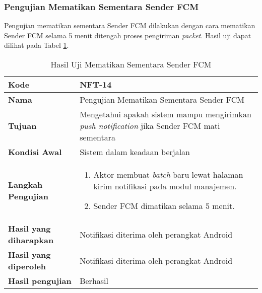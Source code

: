 \subsubsection{Pengujian Mematikan Sementara Sender FCM}
\par Pengujian mematikan sementara Sender FCM dilakukan dengan cara mematikan Sender FCM selama 5 menit ditengah proses pengiriman \textit{packet}. Hasil uji dapat dilihat pada Tabel \ref{t:nft_sender_fcm_mati}.
\begin{longtable}{|p{3cm}|p{6.5cm}|}
	\caption{Hasil Uji Mematikan Sementara Sender FCM} \label{t:nft_sender_fcm_mati} \\ \hline
	\textbf{Kode} & NFT-14 \\ \hline
	\textbf{Nama} & Pengujian Mematikan Sementara Sender FCM \\ \hline
	\textbf{Tujuan} & Mengetahui apakah sistem mampu mengirimkan \textit{push notification} jika Sender FCM mati sementara \\ \hline
	\textbf{Kondisi Awal} & Sistem dalam keadaan berjalan \\ \hline
	\textbf{Langkah Pengujian} &  
	\begin{enumerate}
		\item Aktor membuat \textit{batch} baru lewat halaman kirim notifikasi pada modul manajemen.
		\item Sender FCM dimatikan selama 5 menit.
	\end{enumerate} \\ \hline
	\textbf{Hasil yang diharapkan} & Notifikasi diterima oleh perangkat Android \\ \hline
	\textbf{Hasil yang diperoleh} & Notifikasi diterima oleh perangkat Android \\ \hline
	\textbf{Hasil pengujian} & Berhasil \\ \hline
\end{longtable}
